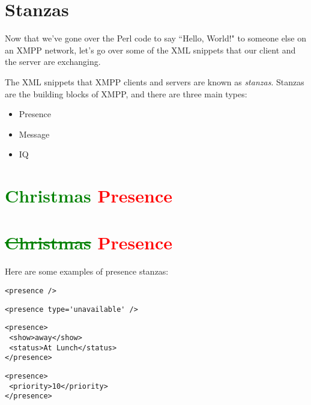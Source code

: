 \section{Stanzas}

Now that we've gone over the Perl code to say ``Hello, World!" to someone else on an XMPP
network, let's go over some of the XML snippets that our client and the server are exchanging.
\pause

The XML snippets that XMPP clients and servers are known as \textit{stanzas}.  Stanzas are the
building blocks of XMPP, and there are three main types:
\pause

\begin{itemize}
\item Presence
\pause
\item Message
\pause
\item IQ
\end{itemize}

\newpage
\section{\textcolor{green}{Christmas} \textcolor{red}{Presence}}

\newpage
\section{\textcolor{green}{\st{Christmas}} \textcolor{red}{Presence}}

\pause
Here are some examples of presence stanzas:

\begin{shaded}
\begin{verbatim}
<presence />
\end{verbatim}
\end{shaded}

\pause
\begin{shaded}
\begin{verbatim}
<presence type='unavailable' />
\end{verbatim}
\end{shaded}

\pause
\begin{shaded}
\begin{verbatim}
<presence>
 <show>away</show>
 <status>At Lunch</status>
</presence>
\end{verbatim}
\end{shaded}

\pause
\begin{shaded}
\begin{verbatim}
<presence>
 <priority>10</priority>
</presence>
\end{verbatim}
\end{shaded}

